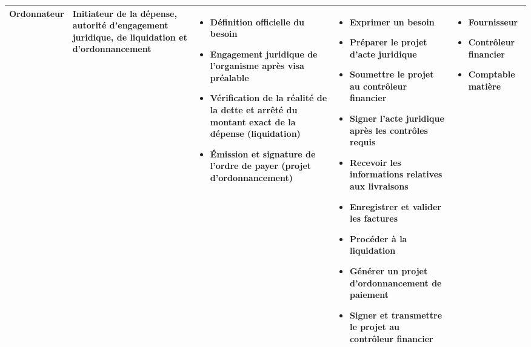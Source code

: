 \begin{landscape}
\begin{longtable}{L{2.8cm} L{3.6cm} L{5.8cm} L{6.2cm} L{3.8cm}}
\textbf{Ordonnateur} &
Initiateur de la dépense, autorité d'engagement juridique, de liquidation et d'ordonnancement &
\begin{itemize}[leftmargin=1em, nosep]
  \item Définition officielle du besoin
  \item Engagement juridique de l'organisme après visa préalable
  \item Vérification de la réalité de la dette et arrêté du montant exact de la dépense (liquidation)
  \item Émission et signature de l'ordre de payer (projet d'ordonnancement)
\end{itemize} &
\begin{itemize}[leftmargin=1em, nosep]
  \item Exprimer un besoin
  \item Préparer le projet d'acte juridique
  \item Soumettre le projet au contrôleur financier
  \item Signer l'acte juridique après les contrôles requis
  \item Recevoir les informations relatives aux livraisons
  \item Enregistrer et valider les factures
  \item Procéder à la liquidation
  \item Générer un projet d'ordonnancement de paiement
  \item Signer et transmettre le projet au contrôleur financier
\end{itemize} &
\begin{itemize}[leftmargin=1em, nosep]
  \item Fournisseur
  \item Contrôleur financier
  \item Comptable matière
\end{itemize} \\
\midrule


\end{longtable}
\end{landscape}

